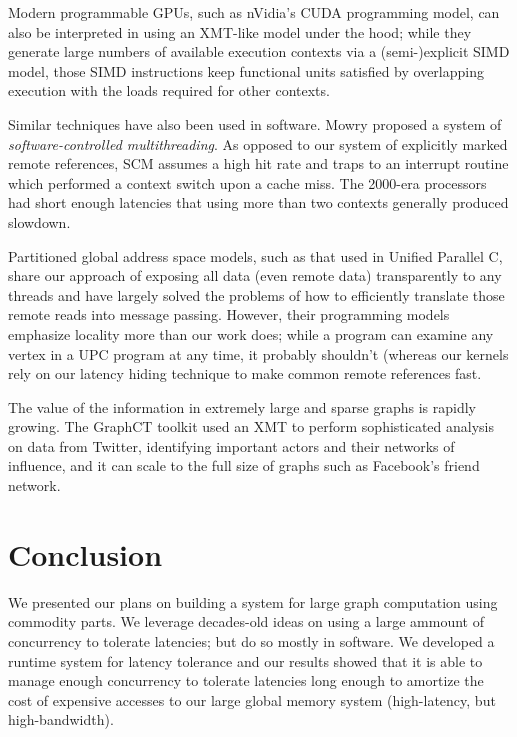 \documentclass[10pt,nocopyrightspace,preprint]{sigplanconf}
\begin{document}
Modern programmable GPUs, such as nVidia's CUDA programming model, can also be interpreted in using an XMT-like
model under the hood;
while they generate large numbers of available execution contexts via
a (semi-)explicit SIMD model, those SIMD instructions keep functional
units satisfied by overlapping execution with the loads required for
other contexts.

Similar techniques have also been used in software.  Mowry proposed a system \cite{mowry-scm} of \emph{software-controlled
  multithreading}.  As opposed to our system of explicitly marked
remote references, SCM assumes a high hit rate and traps to an
interrupt routine which performed a context switch upon a cache miss.  The 2000-era processors had
short enough latencies that using more than two contexts generally
produced slowdown.

Partitioned global address space models, such as that used in Unified Parallel C,
 share our approach of exposing all data (even remote data)
 transparently to any threads and have largely solved the problems of
 how to efficiently translate those remote reads into message
 passing.  However, their programming models emphasize locality more
 than our work does; while a program can examine any vertex in a UPC
 program at any time, it probably shouldn't (whereas our kernels rely on our
 latency hiding technique to make common remote references fast.

The value of the information in extremely large and sparse graphs is
rapidly growing.  The GraphCT toolkit \cite{ediger-graphct} used an XMT to perform
sophisticated analysis on data from Twitter, identifying important
actors and their networks of influence, and it can scale to the full
size of graphs such as Facebook's friend network.

\section{Conclusion}
\label{sec:conclusion}

We presented our plans on building a system for large graph
computation using commodity parts. We leverage decades-old ideas on
using a large ammount of concurrency to tolerate latencies; but do so
mostly in software. We developed a runtime system for latency
tolerance and our results showed that it is able to manage enough
concurrency to tolerate latencies long enough to amortize the cost of
expensive accesses to our large global memory system (high-latency,
but high-bandwidth).



\end{document}
